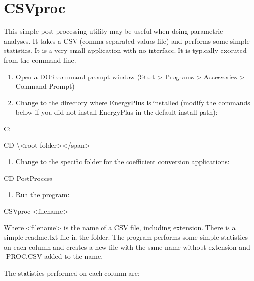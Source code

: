 \chapter{CSVproc}\label{csvproc}

This simple post processing utility may be useful when doing parametric analyses. It takes a CSV (comma separated values file) and performs some simple statistics. It is a very small application with no interface. It is typically executed from the command line.

\begin{enumerate}
\def\labelenumi{\arabic{enumi})}
\item
  Open a DOS command prompt window (Start > Programs > Accessories > Command Prompt)
\item
  Change to the directory where EnergyPlus is installed (modify the commands below if you did not install EnergyPlus in the default install path):
\end{enumerate}

C:

CD \textbackslash{}\textless{}root folder\textgreater{}\textless{}/span\textgreater{}

\begin{enumerate}
\def\labelenumi{\arabic{enumi})}
\setcounter{enumi}{2}
\tightlist
\item
  Change to the specific folder for the coefficient conversion applications:
\end{enumerate}

CD PostProcess

\begin{enumerate}
\def\labelenumi{\arabic{enumi})}
\setcounter{enumi}{3}
\tightlist
\item
  Run the program:
\end{enumerate}

CSVproc \textless{}filename\textgreater{}

Where \textless{}filename\textgreater{} is the name of a CSV file, including extension. There is a simple readme.txt file in the folder. The program performs some simple statistics on each column and creates a new file with the same name without extension and -PROC.CSV added to the name.

The statistics performed on each column are:

